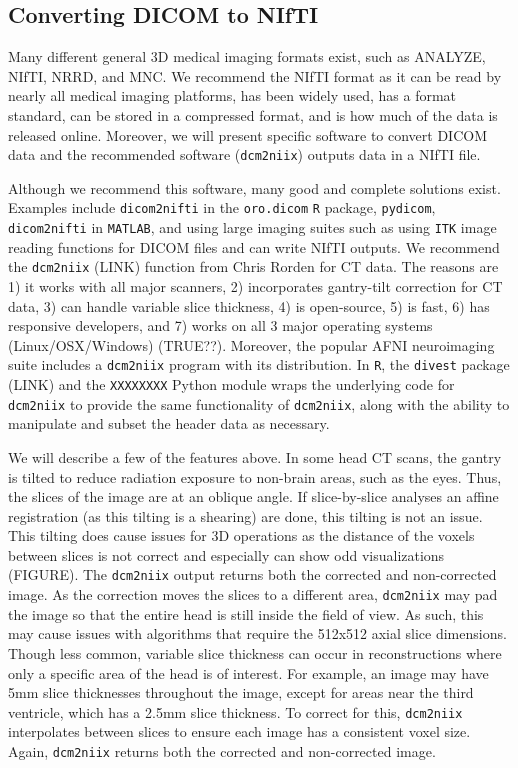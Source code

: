 \documentclass[]{elsarticle} %
\begin{document}
\hypertarget{converting-dicom-to-nifti}{%
\subsection{Converting DICOM to NIfTI}\label{converting-dicom-to-nifti}}

Many different general 3D medical imaging formats exist, such as
ANALYZE, NIfTI, NRRD, and MNC. We recommend the NIfTI format as it can
be read by nearly all medical imaging platforms, has been widely used,
has a format standard, can be stored in a compressed format, and is how
much of the data is released online. Moreover, we will present specific
software to convert DICOM data and the recommended software
(\texttt{dcm2niix}) outputs data in a NIfTI file.

Although we recommend this software, many good and complete solutions
exist. Examples include \texttt{dicom2nifti} in the \texttt{oro.dicom}
\texttt{R} package, \texttt{pydicom}, \texttt{dicom2nifti} in
\texttt{MATLAB}, and using large imaging suites such as using
\texttt{ITK} image reading functions for DICOM files and can write NIfTI
outputs. We recommend the \texttt{dcm2niix} (LINK) function from Chris
Rorden for CT data. The reasons are 1) it works with all major scanners,
2) incorporates gantry-tilt correction for CT data, 3) can handle
variable slice thickness, 4) is open-source, 5) is fast, 6) has
responsive developers, and 7) works on all 3 major operating systems
(Linux/OSX/Windows) (TRUE??). Moreover, the popular AFNI neuroimaging
suite includes a \texttt{dcm2niix} program with its distribution. In
\texttt{R}, the \texttt{divest} package (LINK) and the \texttt{XXXXXXXX}
Python module wraps the underlying code for \texttt{dcm2niix} to provide
the same functionality of \texttt{dcm2niix}, along with the ability to
manipulate and subset the header data as necessary.

We will describe a few of the features above. In some head CT scans, the
gantry is tilted to reduce radiation exposure to non-brain areas, such
as the eyes. Thus, the slices of the image are at an oblique angle. If
slice-by-slice analyses an affine registration (as this tilting is a
shearing) are done, this tilting is not an issue. This tilting does
cause issues for 3D operations as the distance of the voxels between
slices is not correct and especially can show odd visualizations
(FIGURE). The \texttt{dcm2niix} output returns both the corrected and
non-corrected image. As the correction moves the slices to a different
area, \texttt{dcm2niix} may pad the image so that the entire head is
still inside the field of view. As such, this may cause issues with
algorithms that require the 512x512 axial slice dimensions. Though less
common, variable slice thickness can occur in reconstructions where only
a specific area of the head is of interest. For example, an image may
have 5mm slice thicknesses throughout the image, except for areas near
the third ventricle, which has a 2.5mm slice thickness. To correct for
this, \texttt{dcm2niix} interpolates between slices to ensure each image
has a consistent voxel size. Again, \texttt{dcm2niix} returns both the
corrected and non-corrected image.
\end{document}
